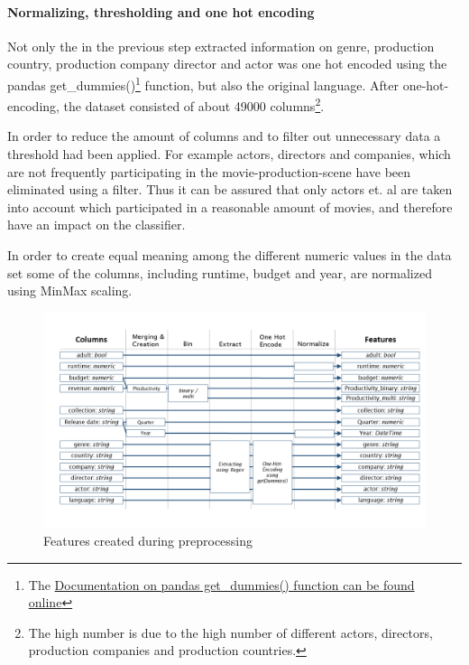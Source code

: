 \paragraph{Normalizing, thresholding and one hot encoding}
Not only the in the previous step extracted information on genre, production country, production company director and actor was one hot encoded using the pandas get\_dummies()\footnote{The \hyperref{https://pandas.pydata.org/pandas-docs/stable/generated/pandas.get_dummies.html}{documentation}{pd.getDumies}{Documentation on pandas get\_dummies() function can be found online}} function, but also the original language. After one-hot-encoding, the dataset consisted of about 49000 columns\footnote{The high number is due to the high number of different actors, directors, production companies and production countries.}.

In order to reduce the amount of columns and to filter out unnecessary data a threshold had been applied. For example actors, directors and companies, which are not frequently participating in the movie-production-scene have been eliminated using a filter. Thus it can be assured that only actors et. al are taken into account which participated in a reasonable amount of movies, and therefore have an impact on the classifier.

In order to create equal meaning among the different numeric values in the data set some of the columns, including runtime, budget and year, are normalized using MinMax scaling.

\begin{figure}[htbp]
	\includegraphics[width=\textwidth]{images/3_features.png}
	\caption{Features created during preprocessing}
	\label{img:features}
\end{figure}
\FloatBarrier


